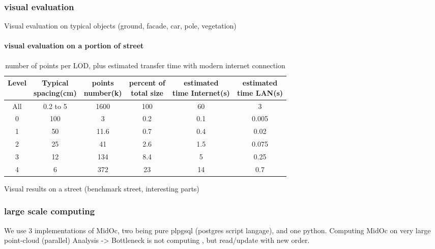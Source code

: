 		\subsubsection{visual evaluation}
			Visual evaluation on typical objects (ground, facade, car, pole, vegetation)
			\paragraph{visual evaluation on a portion of street}
			
			\begin{table}[ht]
				\centering
				\caption{ number of points per LOD, plus estimated transfer time with modern internet connection}
				\scriptsize 
				\begin{tabular}{|c|c|c|c|c|c}
				\hline Level & \shortstack{Typical \\ spacing(cm)} & \shortstack{ points \\ number(k)} & \shortstack{percent of \\ total size} & \shortstack{estimated \\ time Internet(s)} & \shortstack{estimated \\ time LAN(s)} \\
				\hline All & 0.2 to 5  & 1600 & 100 & 60 & 3 \\ 
				\hline 0 & 100 & 3 & 0.2 & 0.1 & 0.005\\ 
				\hline 1 & 50 & 11.6 & 0.7 & 0.4 & 0.02\\ 
				\hline 2 & 25 & 41 & 2.6 & 1.5 & 0.075\\ 
				\hline 3 & 12 & 134 & 8.4 & 5 & 0.25\\ 
				\hline 4 & 6 & 372 & 23 & 14 & 0.7\\  
				
				\hline 
				\end{tabular} 
			\end{table}
			
			Visual results on a street (benchmark street, interesting parts)
			
			
		\subsubsection{large scale computing}
			We use 3 implementations of MidOc, two being pure plpgsql (postgres script langage), and one python.
			Computing MidOc on very large point-cloud (parallel)
			Analysis -> Bottleneck is not computing , but read/update with new order. 
